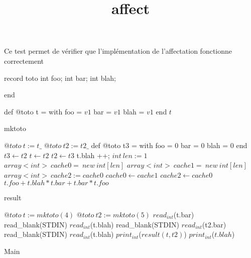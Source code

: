 \documentclass[8pt]{article}
\title{affect}
\begin{document}
\maketitle

Ce test permet de v\'erifier que l'impl\'ementation de l'affectation fonctionne correctement

record toto int foo;
int bar;
int blah;

end

\begin{algorithm}[H]
def @toto t = with foo = $ v1 $
bar = $ v1 $
blah = $ v1 $ end
\Return $ t $\;
\caption{mktoto}
\end{algorithm}
\begin{algorithm}[H]
$@toto\:t := t\_$\;
$@toto\:t2 := t2\_$\;
def @toto t3 = with foo = $ 0 $
bar = $ 0 $
blah = $ 0 $ end
$t3 \leftarrow t2 $\;
$t \leftarrow t2 $\;
$t2 \leftarrow t3 $\;
t.blah ++;
$int\:len := 1$\;
$array<int>\:cache0=\:new\:int[len]$\;
$array<int>\:cache1=\:new\:int[len]$\;
$array<int>\:cache2 := cache0$\;
$cache0 \leftarrow cache1 $\;
$cache2 \leftarrow cache0 $\;
\Return $ t.foo + t.blah * t.bar + t.bar * t.foo $\;
\caption{result}
\end{algorithm}

\begin{algorithm}[H]
$@toto\:t := mktoto(4)$\;
$@toto\:t2 := mktoto(5)$\;
$read_{int}$(t.bar)\;
read\_blank(STDIN)\;
$read_{int}$(t.blah)\;
read\_blank(STDIN)\;
$read_{int}$(t2.bar)\;
read\_blank(STDIN)\;
$read_{int}$(t.blah)\;
$print_{int}$($ result(t, t2) $)\;
$print_{int}$($ t.blah $)\;
\caption{Main}
\end{algorithm}
\end{document}
